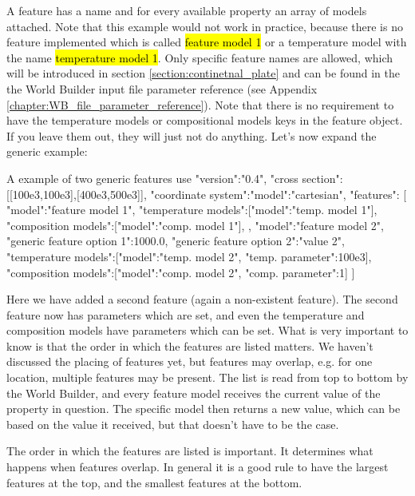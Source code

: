 \documentclass{book}
\newcommand{\WB}{{World Builder}}
\begin{document}
A feature has a name and for every available property an array of models attached. Note that this example would not work in practice, because there is no feature implemented which is called \hl{feature model 1} or a temperature model with the name \hl{temperature model 1}. Only specific feature names are allowed, which will be introduced in section \ref{section:continetnal_plate} and can be found in the the \WB{} input file parameter reference (see Appendix \ref{chapter:WB_file_parameter_reference}). Note that there is no requirement to have the temperature models or compositional models keys in the feature object. If you leave them out, they will just not do anything. Let's now expand the generic example:

\begin{javascriptcode}{A example of two generic features use}{}
{
  "version":"0.4",
  "cross section":[[100e3,100e3],[400e3,500e3]],
  "coordinate system":{"model":"cartesian"},
  "features":
  [
    {
      "model":"feature model 1",
      "temperature models":[{"model":"temp. model 1"}],
      "composition models":[{"model":"comp. model 1"}],
    },
    {
      "model":"feature model 2",
      "generic feature option 1":1000.0,
      "generic feature option 2":"value 2",
      "temperature models":[{"model":"temp. model 2", "temp. parameter":100e3}],
      "composition models":[{"model":"comp. model 2", "comp. parameter":1}]
    }
  ]
}
\end{javascriptcode}

Here we have added a second feature (again a non-existent feature). The second feature now has parameters which are set, and even the temperature and composition models have parameters which can be set. What is very important to know is that the order in which the features are listed matters. We haven't discussed the placing of features yet, but features may overlap, e.g. for one location, multiple features may be present. The list is read from top to bottom by the \WB{}, and every feature model receives the current value of the property in question. The specific model then returns a new value, which can be based on the value it received, but that doesn't have to be the case. 

\begin{remark}
The order in which the features are listed is important. It determines what happens when features overlap. In general it is a good rule to have the largest features at the top, and the smallest features at the bottom.
\end{remark}
\end{document}
